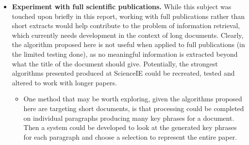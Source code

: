 \begin{itemize}
	\item \textbf{Experiment with full scientific publications.} While this subject was touched upon briefly in this report, working with full publications rather than short extracts would help contribute to the problem of information retrieval, which currently needs development in the context of long documents. Clearly, the algorithm proposed here is not useful when applied to full publications (in the limited testing done), as no meaningful information is extracted beyond what the title of the document should give. Potentially, the strongest algorithms presented produced at ScienceIE could be recreated, tested and altered to work with longer papers.
	\begin{itemize}
		\item One method that may be worth exploring, given the algorithms proposed here are targeting short documents, is that processing could be completed on individual paragraphs producing many key phrases for a document. Then a system could be developed to look at the generated key phrases for each paragraph and choose a selection to represent the entire paper.
	\end{itemize}
\end{itemize}
